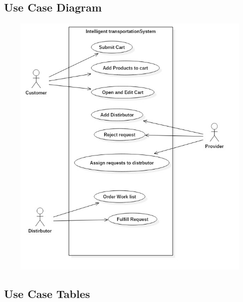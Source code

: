 \documentclass[12pt]{article}
\begin{document}
\subsection{ Use Case Diagram }
\begin{center}
	\includegraphics[width=17cm,height=13cm]{./assets/usecase/use-case-diagram.png}\\
\end{center}

\subsection{ Use Case Tables }
\end{document}
